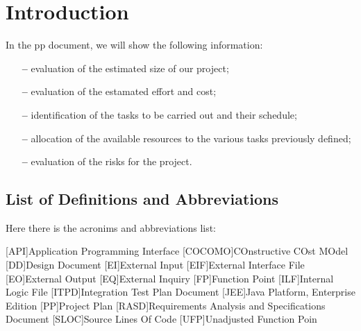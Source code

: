 \section{Introduction} \label{sec:intro}

In the \acl{pp} document, we will show the following information:

\begin{itemize}

\item[\textbf{--}]evaluation of the estimated size of our project;

\item[\textbf{--}]evaluation of the estamated effort and cost;

\item[\textbf{--}]identification of the tasks to be carried out and their schedule;

\item[\textbf{--}]allocation of the available resources to the various tasks previously defined;

\item[\textbf{--}]evaluation of the risks for the project.

\end{itemize}

\subsection{List of Definitions and Abbreviations}
Here there is the acronims and abbreviations list:

\begin{acronym}[API] %

[API]{Application Programming Interface}
[COCOMO]{COnstructive COst MOdel}
[DD]{Design Document}
[EI]{External Input}
[EIF]{External Interface File}
[EO]{External Output}
[EQ]{External Inquiry}
[FP]{Function Point}
[ILF]{Internal Logic File}
[ITPD]{Integration Test Plan Document}
[JEE]{Java Platform, Enterprise Edition}
[PP]{Project Plan}
[RASD]{Requirements Analysis and Specifications Document}
[SLOC]{Source Lines Of Code}
[UFP]{Unadjusted Function Poin}


\end{acronym}

